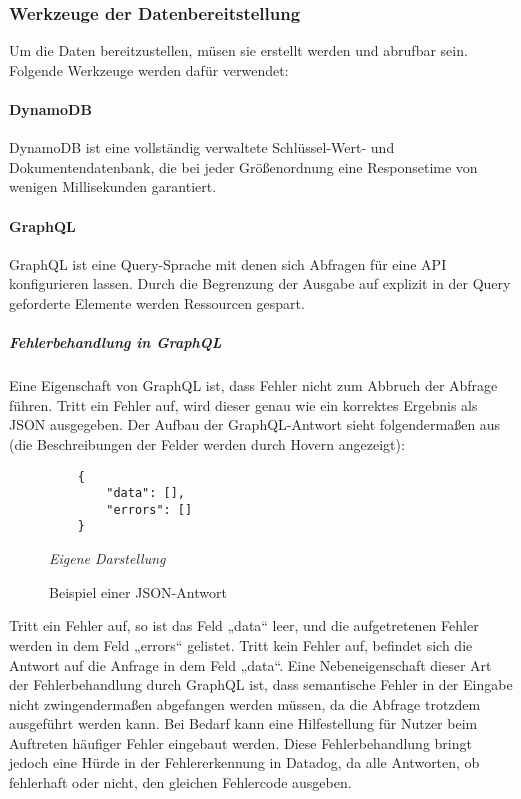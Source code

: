 \subsubsection{Werkzeuge der Datenbereitstellung}
Um die Daten bereitzustellen, müsen sie erstellt werden und abrufbar sein. Folgende Werkzeuge werden dafür verwendet:
\paragraph{DynamoDB} 
DynamoDB ist eine vollständig verwaltete Schlüssel-Wert- und Dokumentendatenbank, die bei jeder Größenordnung eine Responsetime von wenigen Millisekunden garantiert. \cite{AWS2024c}
\paragraph{GraphQL} 
GraphQL ist eine Query-Sprache mit denen sich Abfragen für eine API konfigurieren lassen. Durch die Begrenzung der Ausgabe auf explizit in der Query geforderte Elemente werden Ressourcen gespart. \cite{GraphQL2024}
\subparagraph{Fehlerbehandlung in GraphQL}
Eine Eigenschaft von GraphQL ist, dass Fehler nicht zum Abbruch der Abfrage führen. Tritt ein Fehler auf, wird dieser genau wie ein korrektes Ergebnis als JSON ausgegeben. \cite{GraphQL2024} Der Aufbau der GraphQL-Antwort sieht folgendermaßen aus (die Beschreibungen der Felder werden durch Hovern angezeigt): 

	\begin{figure}[H]
	\centering
	\begin{minipage}[t]{.7\textwidth} %
	\caption{Beispiel einer JSON-Antwort} %
	\begin{verbatim}
	{
	    "data": [],
	    "errors": []
	}
	\end{verbatim}
	
	\textit{Eigene Darstellung} %
	\label{fig:jsonExample}
	\end{minipage}
	\end{figure}
 
Tritt ein Fehler auf, so ist das Feld „data“ leer, und die aufgetretenen Fehler werden in dem Feld „errors“ gelistet. Tritt kein Fehler auf, befindet sich die Antwort auf die Anfrage in dem Feld „data“. \cite{GraphQL2024b}
Eine Nebeneigenschaft dieser Art der Fehlerbehandlung durch GraphQL ist, dass semantische Fehler in der Eingabe nicht zwingendermaßen abgefangen werden müssen, da die Abfrage trotzdem ausgeführt werden kann. Bei Bedarf kann eine Hilfestellung für Nutzer beim Auftreten häufiger Fehler eingebaut werden. 
Diese Fehlerbehandlung bringt jedoch eine Hürde in der Fehlererkennung in Datadog, da alle Antworten, ob fehlerhaft oder nicht, den gleichen Fehlercode ausgeben.
